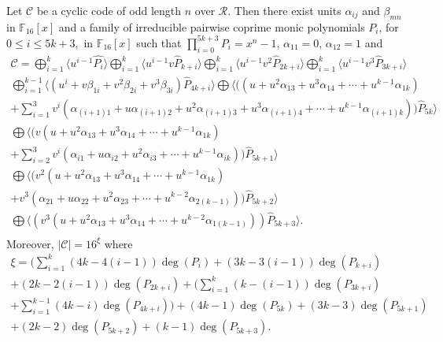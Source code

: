\documentclass[10pt,a4paper]{amsart}
\begin{document}
	\begin{theorem}\label{th3}
		Let $\mathcal{C}$ be a cyclic code of odd length $n$ over $\mathcal{R}$. Then there exist units	$\alpha_{ij} $ and $\beta_{mn}$ in $\mathbb F_{16}[x]$ and a family of irreducible pairwise coprime monic polynomials $P_i$, for $0\leq i\leq 5k+3 ,$ in $\mathbb F_{16}[x]$ such that $\prod_{i=0}^{5k+3} P_i=x^n-1$, $\alpha_{11} = 0 $, $\alpha_{12} = 1 $ and 
  \allowdisplaybreaks\begin{gather*}
		\mathcal{C}= \bigoplus_{i=1}^{k}\langle u^{i-1}\hat{P_{i}}\rangle \bigoplus_{i=1}^{k}\langle u^{i-1}v\hat{P}_{k+i}\rangle \bigoplus_{i=1}^{k}\langle u^{i-1}v^2\hat{P}_{2k+i}\rangle  \bigoplus_{i=1}^{k}\langle u^{i-1}v^3\hat{P}_{3k+i}\rangle \\
        \bigoplus_{i=1}^{k-1} \langle (u^i+ v\beta_{1i} + v^2\beta_{2i} + v^3\beta_{3i})\hat{P}_{4k+i}\rangle   \bigoplus \langle ((u + u^2\alpha_{13} + u^3\alpha_{14} + \cdots + u^{k-1}\alpha_{1k}) \\
      + \sum_{i=1}^{3} v^i( \alpha_{(i+1)1} + u\alpha_{(i+1)2} + u^2\alpha_{(i+1)3} + u^3\alpha_{(i+1)4} + \cdots + u^{k-1}\alpha_{(i+1)k} ))\hat{P}_{5k}\rangle
     \\  \bigoplus  \langle (v(u + u^2\alpha_{13} + u^3\alpha_{14} + \cdots + u^{k-1}\alpha_{1k}) \\ + \sum_{i=2}^{3} v^i( \alpha_{i1} + u\alpha_{i2} + u^2\alpha_{i3} + \cdots + u^{k-1}\alpha_{ik} ))\hat{P}_{5k+1} \rangle
     \\  \bigoplus  \langle (v^2(u + u^2\alpha_{13} + u^3\alpha_{14} + \cdots + u^{k-1}\alpha_{1k})
     \\+ v^3( \alpha_{21} + u\alpha_{22} + u^2\alpha_{23} + \cdots + u^{k-2}\alpha_{2(k-1)}))\hat{P}_{5k+2}\rangle
     \\  \bigoplus \langle (v^3(u + u^2\alpha_{13} + u^3\alpha_{14} + \cdots + u^{k-2}\alpha_{1(k-1)}))\hat{P}_{5k+3}\rangle. \\
		\end{gather*}
    Moreover, $|\mathcal{C}|=16^{\xi}$ where
    \allowdisplaybreaks
    \begin{gather*}
    \xi = ( \sum_{i=1}^{k} (4k-4(i-1))\deg(P_i) + (3k-3(i-1))\deg(P_{k+i})  \\
     + (2k-2(i-1))\deg(P_{2k+i})  + ( \sum_{i=1}^{k} (k-(i-1))\deg(P_{3k+i})
    \\ + \sum_{i=1}^{k-1}(4k-i)\deg(P_{4k+i}) )
    + (4k-1)\deg(P_{5k}) + (3k-3)\deg(P_{5k+1}) \\ + (2k-2)\deg(P_{5k+2}) + (k-1)\deg(P_{5k+3}).\end{gather*}
  \end{theorem}
\end{document}
